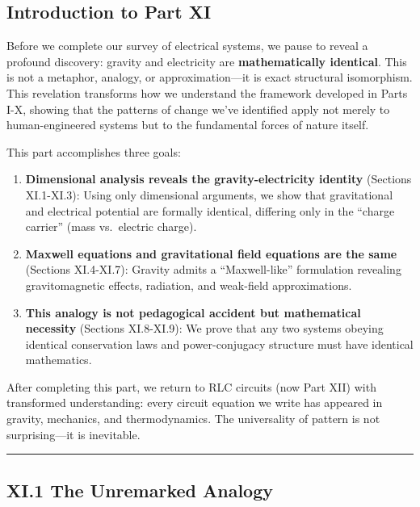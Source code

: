\documentclass[
]{article}
\begin{document}
\subsection{Introduction to Part XI}\label{introduction-to-part-xi}

Before we complete our survey of electrical systems, we pause to reveal
a profound discovery: gravity and electricity are \textbf{mathematically
identical}. This is not a metaphor, analogy, or approximation---it is
exact structural isomorphism. This revelation transforms how we
understand the framework developed in Parts I-X, showing that the
patterns of change we've identified apply not merely to human-engineered
systems but to the fundamental forces of nature itself.

This part accomplishes three goals:

\begin{enumerate}
\def\labelenumi{\arabic{enumi}.}
\item
  \textbf{Dimensional analysis reveals the gravity-electricity identity}
  (Sections XI.1-XI.3): Using only dimensional arguments, we show that
  gravitational and electrical potential are formally identical,
  differing only in the ``charge carrier'' (mass vs.~electric charge).
\item
  \textbf{Maxwell equations and gravitational field equations are the
  same} (Sections XI.4-XI.7): Gravity admits a ``Maxwell-like''
  formulation revealing gravitomagnetic effects, radiation, and
  weak-field approximations.
\item
  \textbf{This analogy is not pedagogical accident but mathematical
  necessity} (Sections XI.8-XI.9): We prove that any two systems obeying
  identical conservation laws and power-conjugacy structure must have
  identical mathematics.
\end{enumerate}

After completing this part, we return to RLC circuits (now Part XII)
with transformed understanding: every circuit equation we write has
appeared in gravity, mechanics, and thermodynamics. The universality of
pattern is not surprising---it is inevitable.

\begin{center}\rule{0.5\linewidth}{0.5pt}\end{center}

\subsection{XI.1 The Unremarked
Analogy}\label{xi.1-the-unremarked-analogy}
\end{document}
